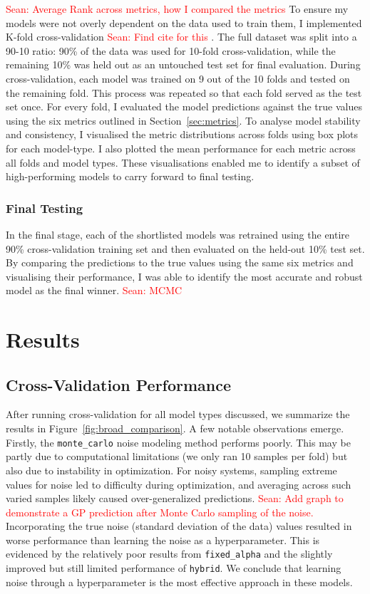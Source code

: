 \documentclass{article}
\newcommand{\Sean}[1]{{\textcolor{red}{{Sean: #1}} }}
\begin{document}
\Sean{Average Rank across metrics, how I compared the metrics}
To ensure my models were not overly dependent on the data used to train them, I implemented K-fold cross-validation \Sean{Find cite for this}. The full dataset was split into a 90-10 ratio: 90\% of the data was used for 10-fold cross-validation, while the remaining 10\% was held out as an untouched test set for final evaluation.
During cross-validation, each model was trained on 9 out of the 10 folds and tested on the remaining fold. This process was repeated so that each fold served as the test set once. For every fold, I evaluated the model predictions against the true values using the six metrics outlined in Section~\ref{sec:metrics}. 
To analyse model stability and consistency, I visualised the metric distributions across folds using box plots for each model-type. I also plotted the mean performance for each metric across all folds and model types. These visualisations enabled me to identify a subset of high-performing models to carry forward to final testing.

\subsubsection*{Final Testing}

In the final stage, each of the shortlisted models was retrained using the entire 90\% cross-validation training set and then evaluated on the held-out 10\% test set. 
By comparing the predictions to the true values using the same six metrics and visualising their performance, I was able to identify the most accurate and robust model as the final winner.
\Sean{MCMC}


\section{Results}

\subsection*{Cross-Validation Performance}

After running cross-validation for all model types discussed, we summarize the results in Figure~\ref{fig:broad_comparison}. A few notable observations emerge. Firstly, the \texttt{monte\_carlo} noise modeling method performs poorly.
This may be partly due to computational limitations (we only ran 10 samples per fold) but also due to instability in optimization. For noisy systems, sampling extreme values for noise led to difficulty during optimization, 
and averaging across such varied samples likely caused over-generalized predictions. \Sean{Add graph to demonstrate a GP prediction after Monte Carlo sampling of the noise.}
Incorporating the true noise (standard deviation of the data) values resulted in worse performance than learning the noise as a hyperparameter.
This is evidenced by the relatively poor results from \texttt{fixed\_alpha} and the slightly improved but still limited performance of \texttt{hybrid}.
We conclude that learning noise through a hyperparameter is the most effective approach in these models.
\end{document}

